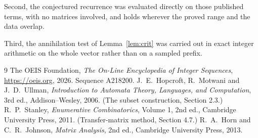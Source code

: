 \documentclass[11pt,a4paper]{article}
\theoremstyle{plain}
\theoremstyle{definition}
\begin{document}
Second, the conjectured recurrence was evaluated directly on those published terms, with no
matrices involved, and holds wherever the proved range and the data overlap.

Third, the annihilation test of Lemma~\ref{lem:crit} was carried out in exact integer
arithmetic on the whole vector rather than on a sampled prefix.

\begin{thebibliography}{9}
 The OEIS Foundation, \emph{The On-Line Encyclopedia of Integer
Sequences}, \url{https://oeis.org}, 2026. Sequence A218200.
 J.~E.~Hopcroft, R.~Motwani and J.~D.~Ullman, \emph{Introduction to Automata
Theory, Languages, and Computation}, 3rd ed., Addison--Wesley, 2006. (The subset
construction, Section 2.3.)
 R.~P.~Stanley, \emph{Enumerative Combinatorics}, Volume 1, 2nd ed.,
Cambridge University Press, 2011. (Transfer-matrix method, Section 4.7.)
 R.~A.~Horn and C.~R.~Johnson, \emph{Matrix Analysis}, 2nd ed., Cambridge
University Press, 2013.
\end{thebibliography}
\end{document}
